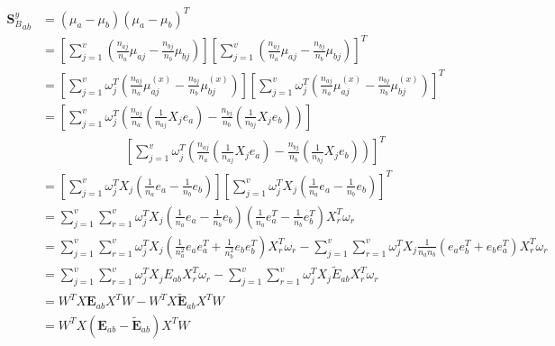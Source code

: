 \begin{appendix}
    \begin{equation}
        \begin{split}
            {\boldsymbol{S}_B^y}_{ab} &= {\left(\mu_a-\mu_b\right)\left(\mu_a-\mu_b\right)^T} \\
            &= \left[\sum_{j=1}^{v}\left(\frac{n_{aj}}{n_a}\mu_{aj} - \frac{n_{bj}}{n_b}\mu_{bj}\right)\right] \left[\sum_{j=1}^{v}\left(\frac{n_{aj}}{n_a}\mu_{aj} - \frac{n_{bj}}{n_b}\mu_{bj}\right)\right]^T \\
            &= \left[\sum_{j=1}^{v}\omega_j^T\left(\frac{n_{aj}}{n_a}\mu^{(x)}_{aj} - \frac{n_{bj}}{n_b}\mu^{(x)}_{bj}\right)\right] \left[\sum_{j=1}^{v}\omega_j^T\left(\frac{n_{aj}}{n_a}\mu^{(x)}_{aj} - \frac{n_{bj}}{n_b}\mu^{(x)}_{bj}\right)\right]^T \\
            &= \left[\sum_{j=1}^{v}\omega_j^T\left(\frac{n_{aj}}{n_a}\left(\frac{1}{n_{aj}}X_j e_a\right) - \frac{n_{bj}}{n_b}\left(\frac{1}{n_{bj}}X_j e_b\right)\right)\right] \\
            &\ \ \ \ \ \ \ \ \ \ \ \ \ \ \ \ \ \ \ \ \ \ \ \ \ \ \ \ \ \ \left[\sum_{j=1}^{v}\omega_j^T\left(\frac{n_{aj}}{n_a}\left(\frac{1}{n_{aj}}X_j e_a\right) - \frac{n_{bj}}{n_b}\left(\frac{1}{n_{bj}}X_j e_b\right)\right)\right]^T \\
            &= \left[\sum_{j=1}^{v}\omega_j^T X_j\left(\frac{1}{n_a}e_a - \frac{1}{n_b}e_b\right)\right] \left[\sum_{j=1}^{v}\omega_j^T X_j\left(\frac{1}{n_a}e_a - \frac{1}{n_b}e_b\right)\right]^T \\
            &= \sum_{j=1}^{v}\sum_{r=1}^{v}\omega_j^T X_j \left(\frac{1}{n_a}e_a - \frac{1}{n_b}e_b\right) \left(\frac{1}{n_a}e_a^T - \frac{1}{n_b}e_b^T\right) X_r^T\omega_r \\
            &= \sum_{j=1}^{v}\sum_{r=1}^{v}\omega_j^T X_j \left(\frac{1}{n_a^2}e_a e_a^T + \frac{1}{n_b^2}e_b e_b^T\right) X_r^T\omega_r - \sum_{j=1}^{v}\sum_{r=1}^{v}\omega_j^T X_j \frac{1}{n_a n_b}\left(e_a e_b^T + e_b e_a^T\right) X_r^T\omega_r \\
            &= \sum_{j=1}^{v}\sum_{r=1}^{v}\omega_j^T X_j E_{ab} X_r^T\omega_r - \sum_{j=1}^{v}\sum_{r=1}^{v}\omega_j^T X_j \tilde{E}_{ab} X_r^T\omega_r \\
            &= W^T X \boldsymbol{E}_{ab} X^T W - W^T X \boldsymbol{\tilde{E}}_{ab} X^T W \\
            &= W^T X \left(\boldsymbol{E}_{ab} - \boldsymbol{\tilde{E}}_{ab}\right) X^T W
        \end{split}
        \label{eq:pcmvda_Sb_i_derivation}
    \end{equation}

\end{appendix}
